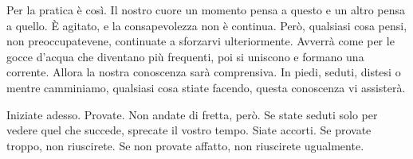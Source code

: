 Per la pratica è così. Il nostro cuore un momento pensa a questo e un
altro pensa a quello. È agitato, e la consapevolezza non è continua.
Però, qualsiasi cosa pensi, non preoccupatevene, continuate a sforzarvi
ulteriormente. Avverrà come per le gocce d'acqua che diventano più
frequenti, poi si uniscono e formano una corrente. Allora la nostra
conoscenza sarà comprensiva. In piedi, seduti, distesi o mentre
camminiamo, qualsiasi cosa stiate facendo, questa conoscenza vi
assisterà.

Iniziate adesso. Provate. Non andate di fretta, però. Se state seduti
solo per vedere quel che succede, sprecate il vostro tempo. Siate
accorti. Se provate troppo, non riuscirete. Se non provate affatto, non
riuscirete ugualmente.


